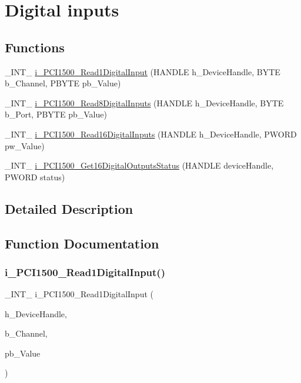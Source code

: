 \hypertarget{group___dig_inp}{}\section{Digital inputs}
\label{group___dig_inp}
\subsection*{Functions}
\begin{DoxyCompactItemize}
\item 
\+\_\+\+I\+N\+T\+\_\+ \mbox{\hyperlink{group___dig_inp_ga63aaa27a13a725cbfa33282a74089204}{i\+\_\+\+P\+C\+I1500\+\_\+\+Read1\+Digital\+Input}} (H\+A\+N\+D\+LE h\+\_\+\+Device\+Handle, B\+Y\+TE b\+\_\+\+Channel, P\+B\+Y\+TE pb\+\_\+\+Value)
\item 
\+\_\+\+I\+N\+T\+\_\+ \mbox{\hyperlink{group___dig_inp_gad7271f154ed93a458813f7a16fb4f4fa}{i\+\_\+\+P\+C\+I1500\+\_\+\+Read8\+Digital\+Inputs}} (H\+A\+N\+D\+LE h\+\_\+\+Device\+Handle, B\+Y\+TE b\+\_\+\+Port, P\+B\+Y\+TE pb\+\_\+\+Value)
\item 
\+\_\+\+I\+N\+T\+\_\+ \mbox{\hyperlink{group___dig_inp_gab9d0edb10325b69dfa219bf830de5fc0}{i\+\_\+\+P\+C\+I1500\+\_\+\+Read16\+Digital\+Inputs}} (H\+A\+N\+D\+LE h\+\_\+\+Device\+Handle, P\+W\+O\+RD pw\+\_\+\+Value)
\item 
\+\_\+\+I\+N\+T\+\_\+ \mbox{\hyperlink{group___dig_inp_gaaca34ffb7b0dd5628ddd4e6d5d57205e}{i\+\_\+\+P\+C\+I1500\+\_\+\+Get16\+Digital\+Outputs\+Status}} (H\+A\+N\+D\+LE device\+Handle, P\+W\+O\+RD status)
\end{DoxyCompactItemize}


\subsection{Detailed Description}


\subsection{Function Documentation}
\mbox{\label{group___dig_inp_ga63aaa27a13a725cbfa33282a74089204}} 
\subsubsection{\texorpdfstring{i\_PCI1500\_Read1DigitalInput()}{i\_PCI1500\_Read1DigitalInput()}}
{\footnotesize\ttfamily \+\_\+\+I\+N\+T\+\_\+ i\+\_\+\+P\+C\+I1500\+\_\+\+Read1\+Digital\+Input (\begin{DoxyParamCaption}\item[{H\+A\+N\+D\+LE}]{h\+\_\+\+Device\+Handle,  }\item[{B\+Y\+TE}]{b\+\_\+\+Channel,  }\item[{P\+B\+Y\+TE}]{pb\+\_\+\+Value }\end{DoxyParamCaption})}

